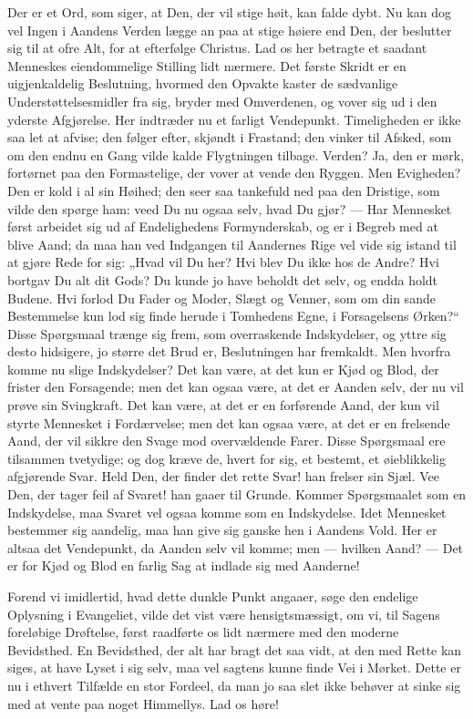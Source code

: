 \documentclass[12pt,a4paper]{book}
\begin{document}
Der er et Ord, som siger, at Den, der vil stige høit, kan falde dybt. Nu kan dog vel
Ingen i Aandens Verden lægge an paa at stige høiere end Den, der beslutter sig til at
ofre Alt, for at efterfølge Christus. Lad os her betragte et saadant Menneskes
eiendommelige Stilling lidt nærmere. Det første Skridt er en uigjenkaldelig Beslutning,
hvormed den Opvakte kaster de sædvanlige Understøttelsesmidler fra sig, bryder med
Omverdenen, og vover sig ud i den yderste Afgjørelse. Her indtræder nu et farligt
Vendepunkt. Timeligheden er ikke saa let at afvise; den følger efter, skjøndt i Frastand;
den vinker til Afsked, som om den endnu en Gang vilde kalde Flygtningen tilbage. Verden?
Ja, den er mørk, fortørnet paa den Formastelige, der vover at vende den Ryggen. Men
Evigheden? Den er kold i al sin Høihed; den seer saa tankefuld ned paa den Dristige, som
vilde den spørge ham: veed Du nu ogsaa selv, hvad Du gjør? --- Har Mennesket først
arbeidet sig ud af Endelighedens Formynderskab, og er i Begreb
med at blive Aand; da maa han ved Indgangen til Aandernes Rige vel vide sig istand til at
gjøre Rede for sig: „Hvad vil Du her? Hvi blev Du ikke hos de Andre? Hvi bortgav Du alt
dit Gods? Du kunde jo have beholdt det selv, og endda holdt Budene. Hvi forlod Du Fader
og Moder, Slægt og Venner, som om din sande Bestemmelse kun lod sig finde herude i
Tomhedens Egne, i Forsagelsens Ørken?“ Disse Spørgsmaal trænge sig frem, som overraskende
Indskydelser, og yttre sig desto hidsigere, jo større det Brud er, Beslutningen har
fremkaldt. Men hvorfra komme nu slige Indskydelser? Det kan være, at det kun er Kjød og
Blod, der frister den Forsagende; men det kan ogsaa være, at det er Aanden selv, der nu
vil prøve sin Svingkraft. Det kan være, at det er en forførende Aand, der kun vil styrte
Mennesket i Fordærvelse; men det kan ogsaa være, at det er en frelsende Aand, der vil
sikkre den Svage mod overvældende Farer. Disse Spørgsmaal ere tilsammen tvetydige; og dog
kræve de, hvert for sig, et bestemt, et øieblikkelig afgjørende Svar. Held Den, der finder
det rette Svar! han frelser sin Sjæl. Vee Den, der tager feil af Svaret! han gaaer til
Grunde. Kommer Spørgsmaalet som en Indskydelse, maa Svaret vel ogsaa komme som en
Indskydelse. Idet Mennesket bestemmer sig aandelig, maa han give sig ganske hen i Aandens
Vold. Her er altsaa det Vendepunkt, da Aanden selv vil komme; men --- hvilken Aand? ---
Det er for Kjød og Blod en farlig Sag at indlade sig med Aanderne!

Forend vi imidlertid, hvad dette dunkle Punkt angaaer, søge den endelige Oplysning i
Evangeliet, vilde det vist være hensigtsmæssigt, om vi, til Sagens foreløbige Drøftelse,
først raadførte os lidt nærmere med den moderne Bevidsthed. En Bevidsthed, der alt har
bragt det saa vidt, at den med Rette kan siges, at have Lyset i sig selv, maa vel sagtens
kunne finde Vei i Mørket. Dette
er nu i ethvert Tilfælde en stor Fordeel, da man jo saa slet ikke behøver at sinke sig med
at vente paa noget Himmellys. Lad os høre!
\end{document}

